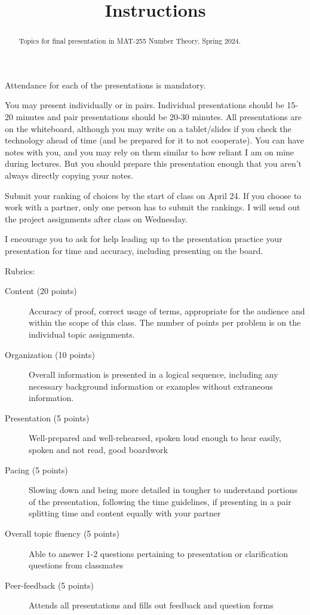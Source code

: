 \documentclass[letterpaper, 11 pt,handout,hints]{ximera}
\title{Instructions}
\begin{document}
\begin{abstract} %
Topics for final presentation in MAT-255 Number Theory, Spring 2024. 
\end{abstract}  
\maketitle
Attendance for each of the presentations is mandatory. 

You may present individually or in pairs. Individual presentations should be 15-20 minutes and pair presentations should be 20-30 minutes. All presentations are on the whiteboard, although you may write on a tablet/slides if you check the technology ahead of time (and be prepared for it to not cooperate). You can have notes with you, and you may rely on them similar to how reliant I am on mine during lectures. But you should prepare this presentation enough that you aren’t always directly copying your notes.

Submit your ranking of choices by the start of class on April 24. If you choose to work with a partner, only one person has to submit the rankings. I will send out the project assignments after class on Wednesday.

I encourage you to ask for help leading up to the presentation practice your presentation for time and accuracy, including presenting on the board.

Rubrics: 
\begin{description}
 	\item[Content (20 points)] Accuracy of proof, correct usage of terms, appropriate for the audience and within the scope of
this class. The number of points per problem is on the individual topic assignments.
	\item[Organization (10 points)] Overall information is presented in a logical sequence, including any necessary background information or examples without extraneous information.
	\item[Presentation (5 points)] Well-prepared and well-rehearsed, spoken loud enough to hear easily, spoken and not read, good boardwork
	\item[Pacing (5 points)] Slowing down and being more detailed in tougher to understand portions of the presentation, following the time guidelines, if presenting in a pair splitting time and content equally with your partner
	\item[Overall topic fluency (5 points)] Able to answer 1-2 questions pertaining to presentation or clarification questions from classmates
	\item[Peer-feedback (5 points)] Attends all presentations and fills out feedback and question forms
\end{description}
\end{document}
